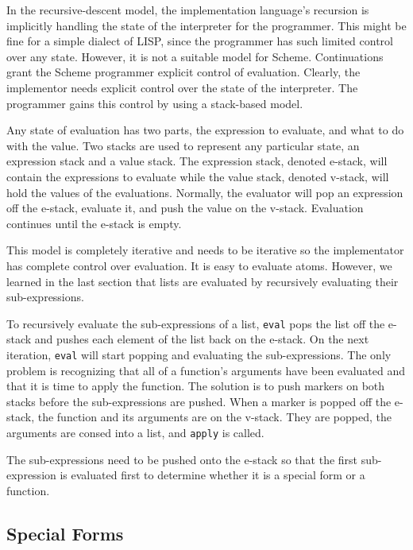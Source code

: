 	In the recursive-descent model, the implementation language's
recursion is implicitly handling the state of the interpreter for the
programmer.  This might be fine for a simple dialect of LISP, since the
programmer has such limited control over any state.  However, it is not a
suitable model for Scheme.  Continuations grant the Scheme programmer
explicit control of evaluation.  Clearly, the implementor needs explicit
control over the state of the interpreter.  The programmer gains this
control by using a stack-based model.

	Any state of evaluation has two parts, the expression to evaluate,
and what to do with the value.  Two stacks are used to represent any
particular state, an expression stack and a value stack.  The expression
stack, denoted e-stack, will contain the expressions to evaluate while the
value stack, denoted v-stack, will hold the values of the evaluations.
Normally, the evaluator will pop an expression off the e-stack, evaluate
it, and push the value on the v-stack.  Evaluation continues until the
e-stack is empty.

	This model is completely iterative and needs to be iterative so
the implementator has complete control over evaluation.  It is easy to
evaluate atoms.  However, we learned in the last section that lists are
evaluated by recursively evaluating their sub-expressions.

	To recursively evaluate the sub-expressions of a list, {\tt eval}
pops the list off the e-stack and pushes each element of the list back on
the e-stack.  On the next iteration, {\tt eval} will start popping and
evaluating the sub-expressions.  The only problem is recognizing that all
of a function's arguments have been evaluated and that it is time to
apply the function.  The solution is to push markers on both stacks
before the sub-expressions are pushed.  When a marker is popped off the
e-stack, the function and its arguments are on the v-stack.  They are
popped, the arguments are consed into a list, and {\tt apply} is called.

	The sub-expressions need to be pushed onto the e-stack so that the
first sub-expression is evaluated first to determine whether it is a
special form or a function.

   \subsection{Special Forms}

